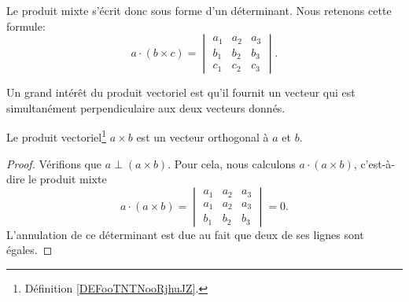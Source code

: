 Le produit mixte s'écrit donc sous forme d'un déterminant. Nous retenons cette formule:
\begin{equation}        \label{EqProduitMixteDet}
    a\cdot (b\times c)=\begin{vmatrix}
        a_1    &   a_2    &   a_3    \\
        b_1    &   b_2    &   b_3    \\
        c_1    &   c_2    &   c_3
    \end{vmatrix}.
\end{equation}

Un grand intérêt du produit vectoriel est qu'il fournit un vecteur qui est simultanément perpendiculaire aux deux vecteurs donnés.
\begin{proposition}     \label{PROPooTUVKooOQXKKl}
    Le produit vectoriel\footnote{Définition \ref{DEFooTNTNooRjhuJZ}.} \( a\times b\) est un vecteur orthogonal à \( a\) et \( b\).
\end{proposition}

\begin{proof}
    Vérifions que $a\perp (a\times b)$. Pour cela, nous calculons $a\cdot (a\times b)$, c'est-à-dire le produit mixte
    \begin{equation}
        a\cdot(a\times b)=\begin{vmatrix}
            a_1    &   a_2    &   a_3    \\
            a_1    &   a_2    &   a_3    \\
            b_1    &   b_2    &   b_3
        \end{vmatrix}=0.
    \end{equation}
    L'annulation de ce déterminant est due au fait que deux de ses lignes sont égales.
\end{proof}

